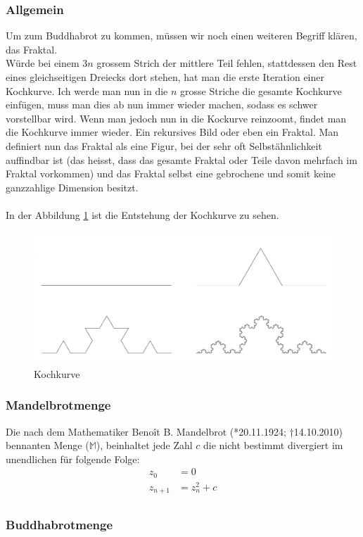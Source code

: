 \subsubsection{Allgemein}
Um zum Buddhabrot zu kommen, müssen wir noch einen weiteren Begriff klären, das Fraktal.\\ Würde bei einem 3$n$ grossem Strich der mittlere Teil fehlen, stattdessen den Rest eines gleichseitigen Dreiecks dort stehen, hat man die erste Iteration einer Kochkurve. Ich werde man nun in die $n$ grosse Striche die gesamte Kochkurve einfügen, muss man dies ab nun immer wieder machen, sodass es schwer vorstellbar wird. Wenn man jedoch nun in die Kockurve reinzoomt, findet man die Kochkurve immer wieder. Ein rekursives Bild oder eben ein Fraktal. Man definiert nun das Fraktal als eine Figur, bei der sehr oft Selbstähnlichkeit auffindbar ist (das heisst, dass das gesamte Fraktal oder Teile davon mehrfach im Fraktal vorkommen) und das Fraktal selbst eine gebrochene und somit keine ganzzahlige Dimension besitzt.\\
\\
In der Abbildung \ref{fig:Kochkurve} ist die Entstehung der Kochkurve zu sehen.

\begin{figure}[h]
    \centering
    \includegraphics[width=.5\textwidth]{Pictures/Kochkurve.png}
    \caption{Kochkurve}
    \label{fig:Kochkurve}
\end{figure}

\subsubsection{Mandelbrotmenge}
Die nach dem Mathematiker Benoît B. Mandelbrot (*20.11.1924; †14.10.2010) bennanten Menge ($\mathbb{M}$), beinhaltet jede Zahl $c$ die nicht bestimmt divergiert im unendlichen für folgende Folge:
\begin{align*}
z_0&=0\\
z_{n+1}&=z^2_n+c\\
\end{align*}
\subsubsection{Buddhabrotmenge}

